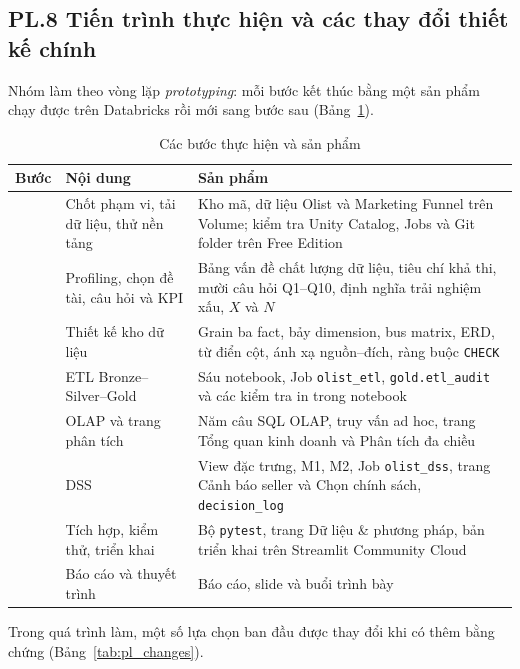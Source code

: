 \documentclass[a4paper]{article}
\begin{document}
\clearpage
{}
\label{pl:8}
\subsection*{PL.8 Tiến trình thực hiện và các thay đổi thiết kế chính}

Nhóm làm theo vòng lặp \textit{prototyping}: mỗi bước kết thúc bằng một sản phẩm chạy được trên Databricks rồi mới sang bước sau (Bảng~\ref{tab:pl_progress}).

\begin{table}[htbp]
\centering
\footnotesize
\setlength{\tabcolsep}{3pt}
\renewcommand{\arraystretch}{1.1}
\caption{Các bước thực hiện và sản phẩm}
\label{tab:pl_progress}
\begin{tabularx}{\textwidth}{@{}>{\raggedright\arraybackslash}p{0.8cm}>{\raggedright\arraybackslash}p{4.0cm}>{\raggedright\arraybackslash}X@{}}
\toprule
\textbf{Bước} & \textbf{Nội dung} & \textbf{Sản phẩm} \\
\midrule
1 & Chốt phạm vi, tải dữ liệu, thử nền tảng & Kho mã, dữ liệu Olist và Marketing Funnel trên Volume; kiểm tra Unity Catalog, Jobs và Git folder trên Free Edition \\
2 & Profiling, chọn đề tài, câu hỏi và KPI & Bảng vấn đề chất lượng dữ liệu, tiêu chí khả thi, mười câu hỏi Q1--Q10, định nghĩa trải nghiệm xấu, $X$ và $N$ \\
3 & Thiết kế kho dữ liệu & Grain ba fact, bảy dimension, bus matrix, ERD, từ điển cột, ánh xạ nguồn--đích, ràng buộc \texttt{CHECK} \\
4 & ETL Bronze--Silver--Gold & Sáu notebook, Job \texttt{olist\_\allowbreak{}etl}, \texttt{gold.etl\_\allowbreak{}audit} và các kiểm tra in trong notebook \\
5 & OLAP và trang phân tích & Năm câu SQL OLAP, truy vấn ad hoc, trang Tổng quan kinh doanh và Phân tích đa chiều \\
6 & DSS & View đặc trưng, M1, M2, Job \texttt{olist\_\allowbreak{}dss}, trang Cảnh báo seller và Chọn chính sách, \texttt{decision\_\allowbreak{}log} \\
7 & Tích hợp, kiểm thử, triển khai & Bộ \texttt{pytest}, trang Dữ liệu \& phương pháp, bản triển khai trên Streamlit Community Cloud \\
8 & Báo cáo và thuyết trình & Báo cáo, slide và buổi trình bày \\
\bottomrule
\end{tabularx}
\end{table}

Trong quá trình làm, một số lựa chọn ban đầu được thay đổi khi có thêm bằng chứng (Bảng~\ref{tab:pl_changes}).
\end{document}
